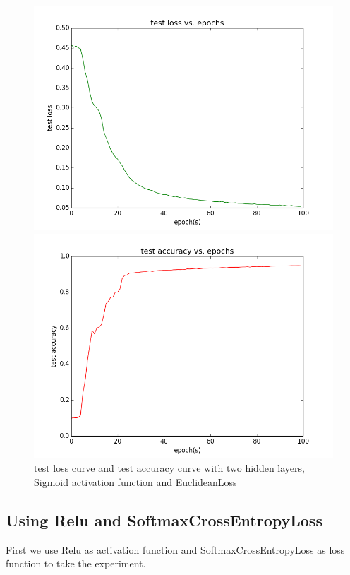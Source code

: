 \documentclass{elegantbook}
\begin{document}
\begin{figure}[!ht]
	\centering
	\begin{minipage}[t]{0.45\textwidth}
		\centering
		\includegraphics[width=\textwidth]{testloss2se}
	\end{minipage}
	\begin{minipage}[t]{0.45\textwidth}
		\centering
		\includegraphics[width=\textwidth]{testacc2se}
	\end{minipage}
	\caption{\label{testcurve22}test loss curve and test accuracy curve with two hidden layers, Sigmoid activation function and EuclideanLoss}
\end{figure}

\subsection{Using Relu and SoftmaxCrossEntropyLoss}
First we use Relu as activation function and SoftmaxCrossEntropyLoss as loss function to take the experiment.
\end{document}
